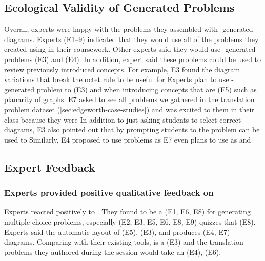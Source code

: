 \subsection{Ecological Validity of Generated Problems}

Overall, experts were happy with the problems they assembled with \Edgeworth-generated diagrams. Experts (E1--9) indicated that they would use all of the problems they created using \Edgeworth in their coursework. Other experts said they would use \Edgeworth-generated problems  (E3) and  (E4). In addition, expert said these problems could be used to review previously introduced concepts. For example, E3 found the diagram variations that break the octet rule to be useful for  Experts plan to use \Edgeworth-generated problem to  (E3) and when introducing concepts that are  (E5) such as planarity of graphs. E7 asked to see all problems we gathered in the translation problem dataset (\cref{sec:edgeworth-case-studies}) and was excited to them in their class because they were  In addition to just asking students to select correct diagrams, E3 also pointed out that by prompting students to  the problem can be used to  Similarly, E4 proposed to use \Edgeworth problems as  E7 even plans to use \Edgeworth as  and  

\subsection{Expert Feedback}

\subsubsection{Experts provided positive qualitative feedback on \Edgeworth}
Experts reacted positively to \Edgeworth. They found \Edgeworth to be a  (E1, E6, E8) for generating multiple-choice problems, especially  (E2, E3, E5, E6, E8, E9) quizzes that  (E8). Experts said the automatic layout of \Edgeworth {} (E5),  (E3), and produces  (E4, E7) diagrams. Comparing with their existing tools, \Edgeworth is a  (E3) and the translation problems they authored during the session would take an  (E4),  (E6).

